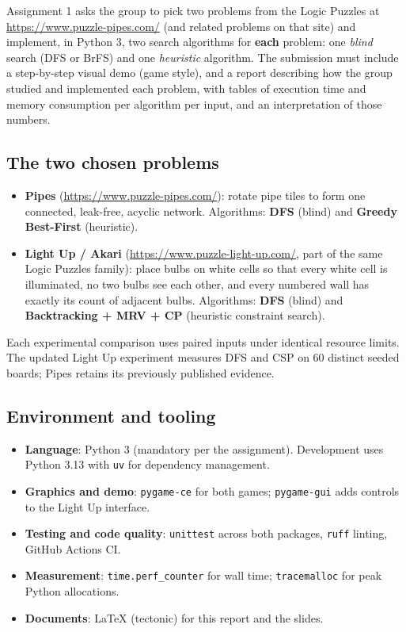 \documentclass[12pt,a4paper]{article}
\newcommand{\code}[1]{\texttt{#1}}
\begin{document}
Assignment 1 asks the group to pick two problems from the Logic Puzzles at
\url{https://www.puzzle-pipes.com/} (and related problems on that site) and
implement, in Python 3, two search algorithms for \textbf{each} problem: one
\emph{blind} search (DFS or BrFS) and one \emph{heuristic} algorithm. The
submission must include a step-by-step visual demo (game
style), and a report describing how the group studied and implemented each
problem, with tables of execution time and memory consumption per algorithm per
input, and an interpretation of those numbers.

\subsection{The two chosen problems}

\begin{itemize}
\item \textbf{Pipes} (\url{https://www.puzzle-pipes.com/}): rotate pipe tiles to
form one connected, leak-free, acyclic network. Algorithms: \textbf{DFS} (blind)
and \textbf{Greedy Best-First} (heuristic).
\item \textbf{Light Up / Akari} (\url{https://www.puzzle-light-up.com/}, part of
the same Logic Puzzles family): place bulbs on white cells so that every white
cell is illuminated, no two bulbs see each other, and every numbered wall has
exactly its count of adjacent bulbs. Algorithms: \textbf{DFS} (blind) and
\textbf{Backtracking + MRV + CP} (heuristic constraint search).
\end{itemize}

Each experimental comparison uses paired inputs under identical resource limits.
The updated Light Up experiment measures DFS and CSP on 60 distinct seeded boards;
Pipes retains its previously published evidence.

\subsection{Environment and tooling}

\begin{itemize}
\item \textbf{Language}: Python 3 (mandatory per the assignment). Development
uses Python 3.13 with \code{uv} for dependency management.
\item \textbf{Graphics and demo}: \code{pygame-ce} for both games;
\code{pygame-gui} adds controls to the Light Up interface.
\item \textbf{Testing and code quality}: \code{unittest} across both packages, \code{ruff} linting, GitHub Actions CI.
\item \textbf{Measurement}: \code{time.perf\_counter} for wall time;
\code{tracemalloc} for peak Python allocations.
\item \textbf{Documents}: \LaTeX{} (tectonic) for this report and the slides.
\end{itemize}
\end{document}
